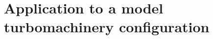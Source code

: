 
\chapter{Application to a model turbomachinery configuration}
\label{cha:model_tbm}

\chabstract{}


\newpage


